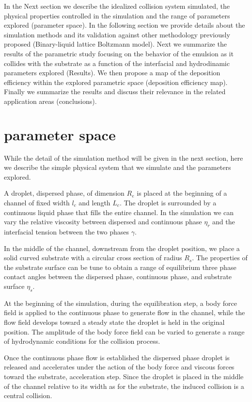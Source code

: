 \documentclass{article}
\begin{document}
In the Next section we describe the idealized collision system simulated, the physical properties controlled in the simulation and the range of parameters explored (parameter space). In the following section we provide details about the simulation methods and its validation against other methodology previously proposed (Binary-liquid lattice Boltzmann model). Next we summarize the results of the parametric study focusing on the behavior of the emulsion as it collides with the substrate as a function of the interfacial and hydrodinamic parameters explored (Results). We then propose a map of the deposition efficiency within the explored parametric space (deposition efficiency map). Finally we summarize the results and discuss their relevance in the related application areas (conclusions). 

\pagebreak 
\section{parameter space}
While the detail of the simulation method will be given in the next section, here we describe the simple physical system that we simulate and the parameters explored.

A droplet, dispersed phase, of dimension $R_e$ is placed at the beginning of a channel of fixed width $l_c$ and length $L_c$. The droplet is surrounded by a continuous liquid phase that fills the entire channel. In the simulation we can vary the relative viscosity between dispersed and continuous phase $\eta_r$ and the interfacial tension between the two phases $\gamma$.

In the middle of the channel, downstream from the droplet position, we place a solid curved substrate with a circular cross section of radius $R_s$. The properties of the substrate surface can be tune to obtain a range of equilibrium three phase contact angles between the dispersed phase, continuous phase, and substrate surface $\eta_s$.  

At the beginning of the simulation, during the equilibration step,  a body force field is applied to the continuous phase to generate flow in the channel, while the flow field develops toward a steady state the droplet is held in the original position. The amplitude of the body force field can be varied to generate a range of hydrodynamic conditions for the collision process.

Once the continuous phase flow is established the dispersed phase droplet is released and accelerates under the action of the body force and viscous forces toward the substrate, acceleration step. Since the droplet is placed in the middle of the channel relative to its width as for the substrate, the induced collision is a central collision.
\end{document}
